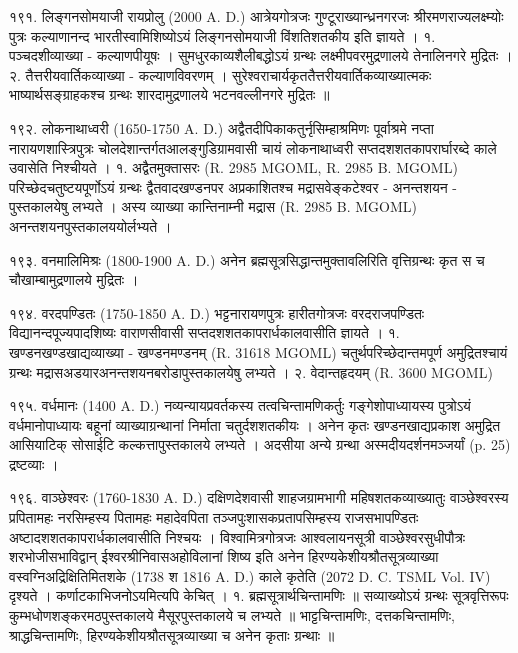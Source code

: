 १९१. लिङ्गनसोमयाजी रायप्रोलु (2000 A. D.)
आत्रेयगोत्रजः गुण्टूराख्यान्ध्रनगरजः श्रीरमणराज्यलक्ष्म्योः पुत्रः कल्याणानन्द भारतीस्वामिशिष्योऽयं लिङ्गनसोमयाजी विंशतिशतकीय इति ज्ञायते ।
१. पञ्चदशीव्याख्या - कल्याणपीयूषः । सुमधुरकाव्यशैलीबद्धोऽयं ग्रन्थः लक्ष्मीपवरमुद्रणालये तेनालिनगरे मुद्रितः ।
२. तैत्तरीयवार्तिकव्याख्या - कल्याणविवरणम् । सुरेश्वराचार्यकृततैत्तरीयवार्तिकव्याख्यात्मकः भाष्यार्थसङ्ग्राहकश्च ग्रन्थः शारदामुद्रणालये भटनवल्लीनगरे मुद्रितः ॥

१९२. लोकनाथाध्वरी (1650-1750 A. D.)
अद्वैतदीपिकाकतुर्नृसिम्हाश्रमिणः पूर्वाश्रमे नप्ता नारायणशास्त्रिपुत्रः चोलदेशान्तर्गतआलङ्गुडिग्रामवासी चायं लोकनाथाध्वरी सप्तदशशतकापरार्घारब्दे काले उवासेति निश्चीयते ।
१. अद्वैतमुक्तासरः (R. 2985 MGOML, R. 2985 B. MGOML)
परिच्छेदचतुष्टयपूर्णोऽयं ग्रन्थः द्वैतवादखण्डनपर अप्रकाशितश्च मद्रासवेङ्कटेश्वर - अनन्तशयन - पुस्तकालयेषु लभ्यते । अस्य व्याख्या कान्तिनाम्नी मद्रास (R. 2985 B. MGOML) अनन्तशयनपुस्तकालययोर्लभ्यते ।

१९३. वनमालिमिश्रः (1800-1900 A. D.)
अनेन ब्रह्मसूत्रसिद्धान्तमुक्तावलिरिति वृत्तिग्रन्थः कृत स च चौखाम्बामुद्रणालये मुद्रितः ।

१९४. वरदपण्डितः (1750-1850 A. D.)
भट्टनारायणपुत्रः हारीतगोत्रजः वरदराजपण्डितः विद्यानन्दपूज्यपादशिष्यः वाराणसीवासी सप्तदशशतकापरार्धकालवासीति ज्ञायते ।
१. खण्डनखण्डखाद्यव्याख्या - खण्डनमण्डनम् (R. 31618 MGOML) चतुर्थपरिच्छेदान्तमपूर्ण अमुद्रितश्चायं ग्रन्थः मद्रासअडयारअनन्तशयनबरोडापुस्तकालयेषु लभ्यते ।
२. वेदान्तहृदयम् (R. 3600 MGOML)

१९५. वर्धमानः (1400 A. D.)
नव्यन्यायप्रवर्तकस्य तत्वचिन्तामणिकर्तुः गङ्गेशोपाध्यायस्य पुत्रोऽयं वर्धमानोपाध्यायः बहूनां व्याख्याग्रन्थानां निर्माता चतुर्दशशतकीयः । अनेन कृतः खण्डनखाद्यप्रकाश अमुद्रित आसियाटिक् सोसाईटि कल्कत्तापुस्तकालये लभ्यते । अदसीया अन्ये ग्रन्था अस्मदीयदर्शनमञ्जर्यां (p. 25) द्रष्टव्याः ।

१९६. वाञ्छेश्वरः (1760-1830 A. D.)
दक्षिणदेशवासी शाहजग्रामभागी महिषशतकव्याख्यातुः वाञ्छेश्वरस्य प्रपितामहः नरसिम्हस्य पितामहः महादेवपिता तञ्जपुःशासकप्रतापसिम्हस्य राजसभापण्डितः अष्टादशशतकापरार्धकालवासीति निश्चयः । विश्वामित्रगोत्रजः आश्वलायनसूत्री वाञ्छेश्वरसुधीपौत्रः शरभोजीसभाविद्वान् ईश्वरश्रीनिवासअहोविलानां शिष्य इति अनेन हिरण्यकेशीयश्रौतसूत्रव्याख्या वस्वग्निअद्रिक्षितिमितशके (1738 श 1816 A. D.) काले कृतेति (2072 D. C. TSML Vol. IV) दृश्यते । कर्णाटकाभिजनोऽयमित्यपि केचित् ।
१. ब्रह्मसूत्रार्थचिन्तामणिः ॥
सव्याख्योऽयं ग्रन्थः सूत्रवृत्तिरूपः कुम्भधोणशङ्करमठपुस्तकालये मैसूरपुस्तकालये च लभ्यते ॥
भाट्टचिन्तामणिः, दत्तकचिन्तामणिः, श्राद्धचिन्तामणिः, हिरण्यकेशीयश्रौतसूत्रव्याख्या च अनेन कृताः ग्रन्थाः ॥

